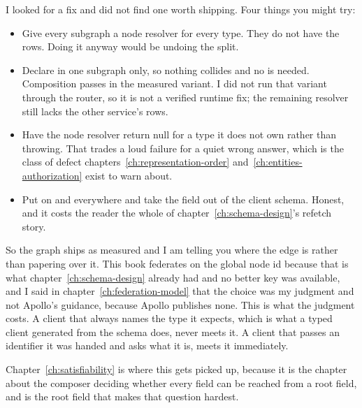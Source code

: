 %
I looked for a fix and did not find one worth shipping. Four things you might
try:

\begin{itemize}
  \item Give every subgraph a node resolver for every type. They do not have
        the rows. Doing it anyway would be undoing the split.
  \item Declare  in one subgraph only, so nothing collides and no
         is needed. Composition passes in the measured
        variant. I did not run that variant through the router, so it is
        not a verified runtime fix; the remaining resolver still lacks
        the other service's rows.
  \item Have the node resolver return null for a type it does not own rather
        than throwing. That trades a loud failure for a quiet wrong answer,
        which is the class of defect chapters~\ref{ch:representation-order}
        and~\ref{ch:entities-authorization} exist to warn about.
  \item Put  on  and  everywhere and
        take the field out of the client schema. Honest, and it costs the
        reader the whole of chapter~\ref{ch:schema-design}'s refetch story.
\end{itemize}

%
So the graph ships as measured and I am telling you where the edge is rather
than papering over it. This book federates on the global node id because that
is what chapter~\ref{ch:schema-design} already had and no better key was
available, and I said in chapter~\ref{ch:federation-model} that the choice was
my judgment and not Apollo's guidance, because Apollo publishes none. This is
what the judgment costs. A client that always names the type it expects, which
is what a typed client generated from the schema does, never meets it. A client
that passes an identifier it was handed and asks what it is, meets it
immediately.

%
Chapter~\ref{ch:satisfiability} is where this gets picked up, because it is the
chapter about the composer deciding whether every field can be reached from a
root field, and  is the root field that makes that question hardest.
%
